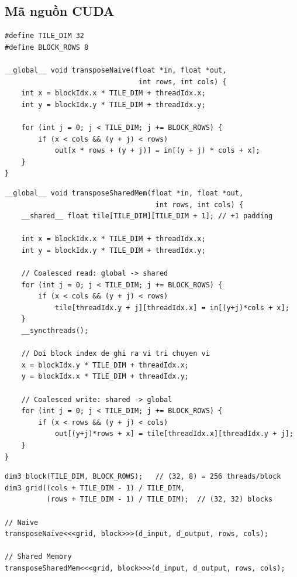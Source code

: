 \documentclass[12pt,a4paper]{article}
\begin{document}
\subsection{Mã nguồn CUDA}

\begin{lstlisting}[style=cudastyle, caption={Kernel Naive Transpose}]
#define TILE_DIM 32
#define BLOCK_ROWS 8

__global__ void transposeNaive(float *in, float *out, 
                                int rows, int cols) {
    int x = blockIdx.x * TILE_DIM + threadIdx.x;
    int y = blockIdx.y * TILE_DIM + threadIdx.y;

    for (int j = 0; j < TILE_DIM; j += BLOCK_ROWS) {
        if (x < cols && (y + j) < rows)
            out[x * rows + (y + j)] = in[(y + j) * cols + x];
    }
}
\end{lstlisting}

\begin{lstlisting}[style=cudastyle, caption={Kernel Shared Memory Transpose}]
__global__ void transposeSharedMem(float *in, float *out, 
                                    int rows, int cols) {
    __shared__ float tile[TILE_DIM][TILE_DIM + 1]; // +1 padding

    int x = blockIdx.x * TILE_DIM + threadIdx.x;
    int y = blockIdx.y * TILE_DIM + threadIdx.y;

    // Coalesced read: global -> shared
    for (int j = 0; j < TILE_DIM; j += BLOCK_ROWS) {
        if (x < cols && (y + j) < rows)
            tile[threadIdx.y + j][threadIdx.x] = in[(y+j)*cols + x];
    }
    __syncthreads();

    // Doi block index de ghi ra vi tri chuyen vi
    x = blockIdx.y * TILE_DIM + threadIdx.x;
    y = blockIdx.x * TILE_DIM + threadIdx.y;

    // Coalesced write: shared -> global
    for (int j = 0; j < TILE_DIM; j += BLOCK_ROWS) {
        if (x < rows && (y + j) < cols)
            out[(y+j)*rows + x] = tile[threadIdx.x][threadIdx.y + j];
    }
}
\end{lstlisting}

\begin{lstlisting}[style=cudastyle, caption={Host code -- cấu hình grid \& block}, firstnumber=25]
dim3 block(TILE_DIM, BLOCK_ROWS);   // (32, 8) = 256 threads/block
dim3 grid((cols + TILE_DIM - 1) / TILE_DIM,
          (rows + TILE_DIM - 1) / TILE_DIM);  // (32, 32) blocks

// Naive
transposeNaive<<<grid, block>>>(d_input, d_output, rows, cols);

// Shared Memory
transposeSharedMem<<<grid, block>>>(d_input, d_output, rows, cols);
\end{lstlisting}
\end{document}
